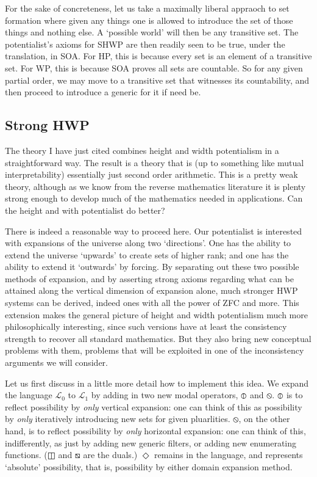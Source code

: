 \documentclass{article}
\begin{document}
For the sake of concreteness, let us take a maximally liberal appraoch to set 
formation where given any things one is allowed to introduce the set of those 
things and nothing else. A `possible world' will then be any transitive set.
The potentialist's axioms for SHWP are then readily seen to be true, 
under the translation, 
in SOA. For HP, this is because every set is an element of a transitive set. 
For WP, this is because SOA proves all sets are countable. So for any 
given partial order, we may move to a transitive set that witnesses its countability, 
and then proceed to introduce a generic for it if need be.

\subsection{Strong HWP}
The theory I have just cited combines height and width potentialism in a 
straightforward way. The result is a theory that is (up to something like 
mutual interpretability) 
essentially just second order arithmetic. This is a pretty weak theory, although as we know 
from the reverse mathematics literature it is plenty strong enough to develop 
much of the mathematics needed in applications. Can the height and with potentialist 
do better?

There is indeed a reasonable way to proceed here. Our potentialist is interested 
with expansions of the universe along two `directions'. One has the ability 
to extend the universe `upwards' to create sets of higher rank; and one has the ability 
to extend it `outwards' by forcing. By separating out these two possible methods of 
expansion, and by asserting strong axioms regarding what can be attained along the 
vertical dimension of expansion alone, much stronger HWP systems can be derived,
indeed ones with all the power of ZFC and more. This extension makes the general 
picture of height and width potentialism much more philosophically interesting, since 
such versions have at least the consistency strength to recover all standard mathematics.
But they also bring new conceptual problems with them, problems that will be exploited 
in one of the inconsistency arguments we will consider. 

Let us first discuss in a little more detail how to implement this idea. We expand 
the language $\mathcal{L}_0$ to $\mathcal{L}_1$ by adding in two new modal operators, 
$\circledbar$ and $\circledbslash$. $\circledbar$ is to reflect possibility by \emph{only} vertical expansion: 
one can think of this as possibility by \emph{only} iteratively introducing new sets 
for given pluarlities. $\circledbslash$, on the other hand, is to reflect possibility by \emph{only}
horizontal expansion: one can think of this, indifferently, as just by adding 
new generic filters, or adding new enumerating functions. ($\boxbar$ and $\boxbslash$
are the duals.) $\Diamond$ remains in the 
language, and represents `absolute' possibility, that is, possibility by either 
domain expansion method. 
\end{document}
